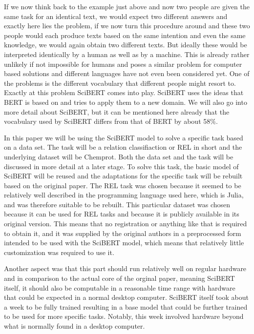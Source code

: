 If we now think back to the example just above and now two people are given the same task for an identical text, we would expect two different answers and exactly here lies the problem, if we now turn this procedure around and these two people would each produce texts based on the same intention and even the same knowledge, we would again obtain two different texts. But ideally these would be interpreted identically by a human as well as by a machine. This is already rather unlikely if not impossible for humans and poses a similar problem for computer based solutions and different languages have not even been considered yet. One of the problems is the different vocabulary that different people might resort to. Exactly at this problem SciBERT \cite{Beltagy2019} comes into play. SciBERT uses the ideas that BERT is based on and tries to apply them to a new domain. We will also go into more detail about SciBERT, but it can be mentioned here already that the vocabulary used by SciBERT differs from that of BERT by about 58\%. \cite{Beltagy2019} 

In this paper we will be using the SciBERT model to solve a specific task based on a data set. The task will be a relation classifiaction or REL in short and the underlying dataset will be Chemprot.\cite{Wang2016} Both the data set and the task will be discussed in more detail at a later stage. To solve this task, the basic model of SciBERT will be reused and the adaptations for the specific task will be rebuilt based on the original paper. The REL task was chosen because it seemed to be relatively well described in the programming language used here, which is Julia, and was therefore suitable to be rebuilt. This particular dataset was chosen because it can be used for REL tasks and because it is publicly available in its original version. This means that no registration or anything like that is required to obtain it, and it was supplied by the original authors in a preprocessed form intended to be used with the SciBERT model, which means that relatively little customization was required to use it.

Another aspect was that this part should run relatively well on regular hardware and in comparison to the actual core of the orginal paper, meaning SciBERT itself, it should also be computable in a reasonable time range with hardware that could be expected in a normal desktop computer. SciBERT itself took about a week to be fully trained resulting in a base model that could be further trained to be used for more specific tasks. Notably, this week involved hardware beyond what is normally found in a desktop computer.   

